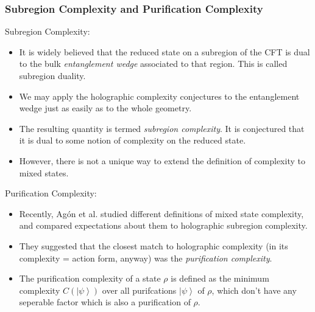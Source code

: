 \documentclass[10pt,aspectratio=169]{beamer}
\newcommand{\ket}[1]{\left| #1 \right>}
\begin{document}
\begin{frame}
\frametitle{Subregion Complexity and Purification Complexity}

Subregion Complexity:

\begin{itemize}

\item It is widely believed that the reduced state on a subregion of the CFT is dual to the bulk {\it entanglement wedge} associated to that region. This is called subregion duality.

\item We may apply the holographic complexity conjectures to the entanglement wedge just as easily as to the whole geometry.

\item The resulting quantity is termed {\it subregion complexity}. It is conjectured that it is dual to some notion of complexity on the reduced state.

\item However, there is not a unique way to extend the definition of complexity to mixed states.

\end{itemize}

Purification Complexity:

\begin{itemize}

\item Recently, Ag\'on et al. studied different definitions of mixed state complexity, and compared expectations about them to holographic subregion complexity.

\item They suggested that the closest match to holographic complexity (in its complexity = action form, anyway) was the {\it purification complexity}.

\item The purification complexity of a state $\rho$ is defined as the minimum complexity $C(\ket{\psi})$ over all purifcations $\ket{\psi}$ of $\rho$, which don't have any seperable factor which is also a purification of $\rho$.

\end{itemize}

\end{frame}
\end{document}
